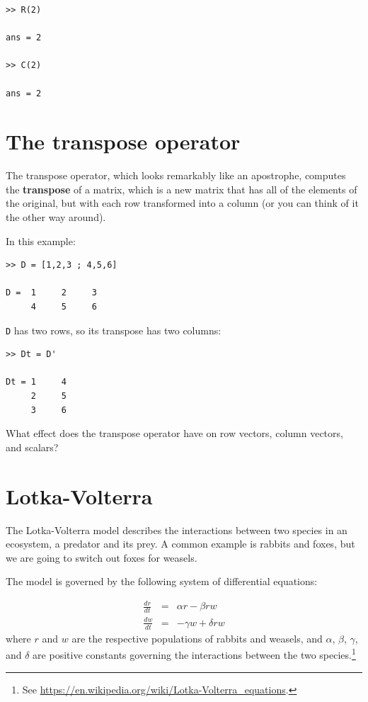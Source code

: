 \documentclass[
]{book}
\begin{document}
\begin{verbatim}
>> R(2)

ans = 2

>> C(2)

ans = 2
\end{verbatim}



\section{The transpose operator}

The transpose operator, which looks remarkably like an apostrophe,
computes the {\bf transpose} of a matrix, which is a new matrix
that has all of the elements of the original, but with each row
transformed into a column (or you can think of it the other way around).

In this example:

\begin{verbatim}
>> D = [1,2,3 ; 4,5,6]

D =  1     2     3
     4     5     6
\end{verbatim}

{\tt D} has two rows, so its transpose has two columns:

\begin{verbatim}
>> Dt = D'

Dt = 1     4
     2     5
     3     6
\end{verbatim}

\begin{ex}
What effect does the transpose operator
have on row vectors, column vectors, and scalars?
\end{ex}


\section{Lotka-Volterra}
\label{sect:lotka}

The Lotka-Volterra model describes the interactions between two
species in an ecosystem, a predator and its prey.  A common example
is rabbits and foxes, but we are going to switch out foxes for weasels.

The model is governed by the following system of differential equations:

\begin{eqnarray}
    \frac{dr}{dt} &=& \alpha r - \beta r w
    \\[6pt]
    \frac{dw}{dt} &=& - \gamma w + \delta r w
\end{eqnarray}
%
where $r$ and $w$ are the respective populations of rabbits and weasels,
and $\alpha$, $\beta$, $\gamma$, and $\delta$ are positive constants
governing the interactions between the two species.\footnote{See
\url{https://en.wikipedia.org/wiki/Lotka-Volterra_equations}.}
\end{document}
